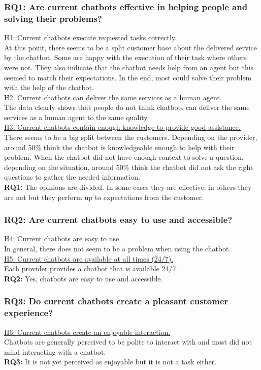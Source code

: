 \subsubsection{RQ1: Are current chatbots effective in helping people and
	solving their problems?}
\ul{H1: Current chatbots execute requested tasks correctly.}\\
At this point, there seems to be a split customer base about the delivered service by the chatbot. Some are happy with the execution of their task where others were not. They also indicate that the chatbot needs help from an agent but this seemed to match their expectations. In the end, most could solve their problem with the help of the chatbot.\\
\break
\ul{H2: Current chatbots can deliver the same services as a human
	agent.}\\
The data clearly shows that people do not think chatbots can deliver the same services as a human agent to the same quality.\\
\break
\ul{H3: Current chatbots contain enough knowledge to provide good
	assistance.}\\
There seems to be a big split between the customers. Depending on the provider, around 50\% think the chatbot is knowledgeable enough to help with their problem. When the chatbot did not have enough context to solve a question, depending on the situation, around 50\% think the chatbot did not ask the right questions to gather the needed information.\\
\break
\textbf{RQ1:} The opinions are divided. In some cases they are effective, in others they are not but they perform up to expectations from the customer.
\subsubsection{RQ2: Are current chatbots easy to use and accessible?}
\ul{H4: Current chatbots are easy to use.}\\
In general, there does not seem to be a problem when using the chatbot.\\
\break
\ul{H5: Current chatbots are available at all times (24/7).}\\
Each provider provides a chatbot that is available 24/7.\\
\break
\textbf{RQ2:} Yes, chatbots are easy to use and accessible.
\subsubsection{RQ3: Do current chatbots create a pleasant customer experience?}
\ul{H6: Current chatbots create an enjoyable interaction.}\\
Chatbots are generally perceived to be polite to interact with and most did not mind interacting with a chatbot.\\
\break
\textbf{RQ3:} It is not yet perceived as enjoyable but it is not a task either.
